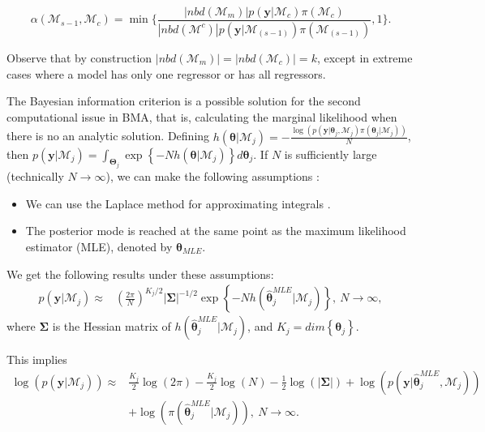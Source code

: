 \begin{equation*}
	\alpha (\mathcal{M}_{s-1},\mathcal{M}_{c})=\min \bigg \{ \frac{|nbd(\mathcal{M}_m)|p(\bm{y} | \mathcal{M}_c)\pi(\mathcal{M}_c)}{|nbd(\mathcal{M}^{c})|p(\bm{y}| \mathcal{M}_{(s-1)})\pi(\mathcal{M}_{(s-1)})},1 \bigg \}.
\end{equation*}

Observe that by construction $|nbd(\mathcal{M}_m)|=|nbd(\mathcal{M}_c)|=k$, except in extreme cases where a model has only one regressor or has all regressors.

The Bayesian information criterion is a possible solution for the second computational issue in BMA, that is, calculating the marginal likelihood when there is no an analytic solution. Defining $h(\bm{\theta}|\mathcal{M}_j)=-\frac{\log(p(\bm{y}| \bm{\theta}_j,\mathcal{M}_j)\pi(\bm{\theta}_j | \mathcal{M}_j))}{N}$, then $p(\bm{y} | \mathcal{M}_j)=\int_{\bm{\Theta}_j} \exp\left\{-N h(\bm{\theta}|\mathcal{M}_j)\right\}  d\bm{\theta}_{j}$. If $N$ is sufficiently large (technically $N\to \infty$), we can make the following assumptions \cite{Hoeting1999}:

\begin{itemize}
	\item We can use the Laplace method for approximating integrals \cite{Tierney1986}.
	\item The posterior mode is reached at the same point as the maximum likelihood estimator (MLE), denoted by $\hat{\bm{\theta}}_{MLE}$.
\end{itemize}

We get the following results under these assumptions:
\begin{align*}
	p(\bm{y} | \mathcal{M}_j)\approx&\left( \frac{2\pi}{N}\right)^{K_j/2}|\bm{\Sigma}|^{-1/2} \exp\left\{-N h(\bm{\hat{\theta}}_j^{MLE}|\mathcal{M}_j)\right\}, \ N\rightarrow\infty,
\end{align*}
where $\bm{\Sigma}$ is the Hessian matrix of $h(\bm{\hat{\theta}}_j^{MLE}|\mathcal{M}_j)$, and $K_j=dim\left\{\bm{\theta}_j\right\}$.

This implies
\begin{align*}
	\log\left(p(\bm{y} | \mathcal{M}_j)\right)\approx& \frac{K_j}{2}\log(2\pi)- \frac{K_j}{2}\log(N) -\frac{1}{2}\log(|\bm{\Sigma}|) + \log(p(\bm{y}| \bm{\hat{\theta}}_j^{MLE},\mathcal{M}_j))\\
	&+\log(\pi(\bm{\hat{\theta}}_j^{MLE} | \mathcal{M}_j)), \ N\rightarrow\infty.
\end{align*}

